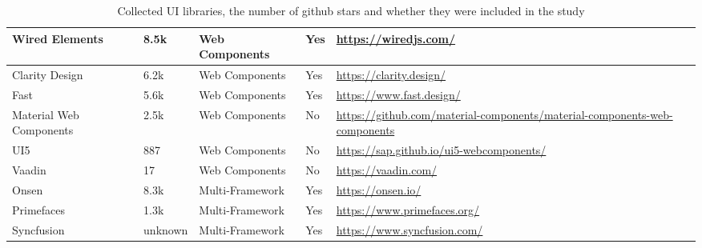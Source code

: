 \begin{table*}[t]
\begin{tabularx}{\textwidth}{l|l|l|l|X}
		Wired Elements          & 8.5k                  & Web Components        & Yes               & \url{https://wiredjs.com/}                                                       \\ \hline
		Clarity Design          & 6.2k                  & Web Components        & Yes               & \url{https://clarity.design/}                                                    \\ \hline
		Fast                    & 5.6k                  & Web Components        & Yes               & \url{https://www.fast.design/}                                                   \\ \hline
		Material Web Components & 2.5k                  & Web Components        & No                & \url{https://github.com/material-components/material-components-web-components } \\ \hline
		UI5                     & 887                   & Web Components        & No                & \url{https://sap.github.io/ui5-webcomponents/}                                   \\ \hline
		Vaadin                  & 17                    & Web Components        & No                & \url{https://vaadin.com/}                                                        \\ \hline
		Onsen                   & 8.3k                  & Multi-Framework       & Yes               & \url{https://onsen.io/}                                                          \\ \hline
		Primefaces              & 1.3k                  & Multi-Framework       & Yes               & \url{https://www.primefaces.org/}                                                \\ \hline
		Syncfusion              & unknown               & Multi-Framework       & Yes               & \url{https://www.syncfusion.com/}
	\end{tabularx}
	\caption{Collected UI libraries, the number of github stars and whether they were included in the study}
	\label{tab:design:ui-libraries}
\end{table*}
